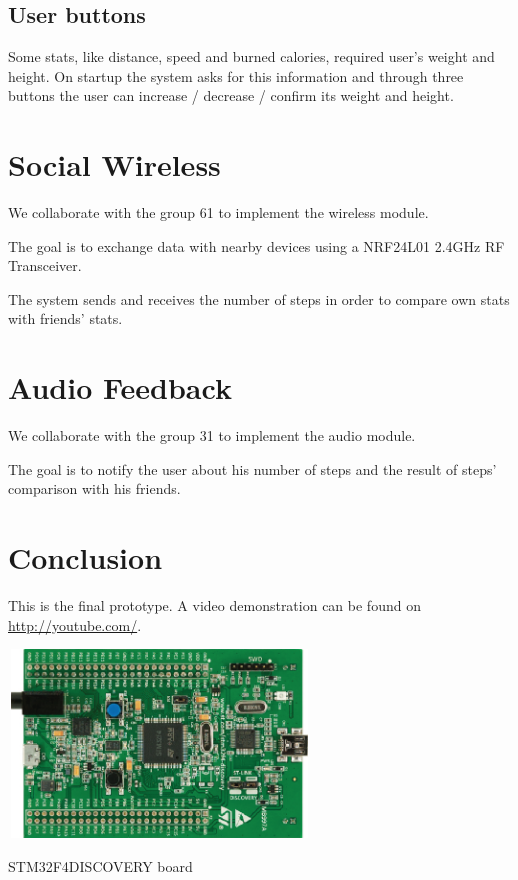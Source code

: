 \documentclass[a4paper,10pt]{article}
\makeatletter
\newenvironment{figurehere}{\def\@captype{figure}\vspace{2ex}}{\vspace{1ex}}
\makeatother
\begin{document}
\begin{multicols}{2}
\subsection{User buttons}
Some stats, like distance, speed and burned calories, required user's weight and height. 
On startup the system asks for this information and through three buttons the user can increase / decrease / confirm its weight and height.

\section{Social Wireless}
We collaborate with the group 61 to implement the wireless module. \cite{group61}

The goal is to exchange data with nearby devices using a NRF24L01 2.4GHz RF Transceiver.

The system sends and receives the number of steps in order to compare own stats with friends' stats.

\section{Audio Feedback}

We collaborate with the group 31 to implement the audio module. \cite{group31}

The goal is to notify the user about his number of steps and the result of steps' comparison with his friends.


\section{Conclusion}

This is the final prototype. A video demonstration can be found on \url{http://youtube.com/}.

\begin{figurehere}
 \centering
 \includegraphics[width=8cm, height=5cm]{./eps/STM32F4.eps}
 \caption{STM32F4DISCOVERY board}
 \label{fig:STM32F4}
\end{figurehere}




\end{multicols}
\end{document}
